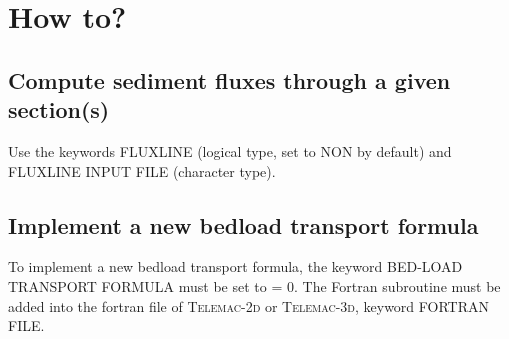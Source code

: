 \chapter[How to]{How to?}
\pagebreak
\section{Compute sediment fluxes through a given section(s)}
Use the keywords {\ttfamily FLUXLINE} (logical type, set to {\ttfamily NON} by default) and {\ttfamily FLUXLINE INPUT FILE} (character type).

\pagebreak
\section{Implement a new bedload transport formula}
To implement a new bedload transport formula, the keyword {\ttfamily BED-LOAD TRANSPORT FORMULA} must be set to {\ttfamily = 0}. The Fortran subroutine must be added into the fortran file of \textsc{Telemac-2d} or \textsc{Telemac-3d}, keyword {\ttfamily FORTRAN FILE}.

